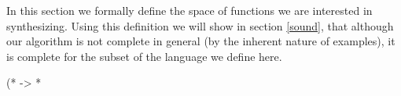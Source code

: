 In this section we formally define the space of functions we are interested in synthesizing. Using this definition we will show in section \ref{sound}, that although our algorithm is not complete in general (by the inherent nature of examples), it is complete for the subset of the language we define here.

(* -> *